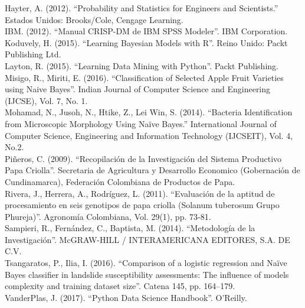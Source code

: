 \noindent
Hayter, A. (2012). "`Probability and Statistics for Engineers and Scientists."' Estados Unidos: Brooks/Cole, Cengage Learning.\\

\noindent
IBM. (2012). "`Manual CRISP-DM de IBM SPSS Modeler"'. IBM Corporation.\\

\noindent
Koduvely, H. (2015). "`Learning Bayesian Models with R"'. Reino Unido: Packt Publishing Ltd.\\

\noindent
Layton, R. (2015). "`Learning Data Mining with Python"'. Packt Publishing.\\

\noindent
Misigo, R., Miriti, E. (2016). "`Classification of Selected Apple Fruit Varieties using Naive Bayes"'. Indian Journal of Computer Science and Engineering (IJCSE), Vol. 7, No. 1.\\

\noindent
Mohamad, N., Jusoh, N., Htike, Z., Lei Win, S. (2014). "`Bacteria Identification from Microscopic Morphology Using Naïve Bayes."' International Journal of Computer Science, Engineering and Information Technology (IJCSEIT), Vol. 4, No.2.\\

\noindent
Piñeros, C. (2009). "`Recopilación de la Investigación del Sistema Productivo Papa Criolla"'. Secretaria de Agricultura y Desarrollo Economico (Gobernación de Cundinamarca), Federación Colombiana de Productos de Papa.\\

\noindent
Rivera, J., Herrera, A., Rodríguez, L. (2011). "`Evaluación de la aptitud de procesamiento en seis genotipos de papa criolla (Solanum tuberosum Grupo Phureja)"'. Agronomía Colombiana, Vol. 29(1), pp. 73-81.\\

\noindent
Sampieri, R., Fernández, C., Baptista, M. (2014). "`Metodología de la Investigación"'. McGRAW-HILL / INTERAMERICANA EDITORES, S.A. DE C.V.\\

\noindent
Tsangaratos, P., Ilia, I. (2016). "`Comparison of a logistic regression and Naïve Bayes classifier in landslide susceptibility assessments: The influence of models complexity and training dataset size"'. Catena 145, pp. 164–179.\\

\noindent
VanderPlas, J. (2017). "`Python Data Science Handbook"'. O’Reilly.\\


